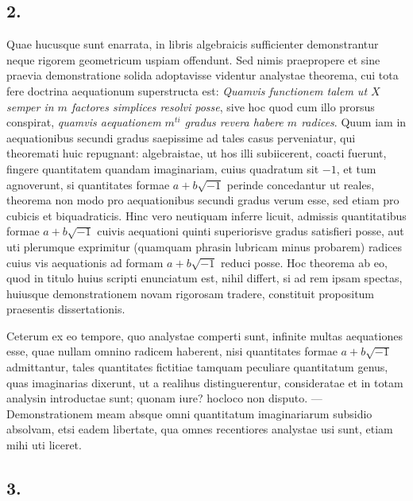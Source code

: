 \documentclass[twoside,12pt, showframe]{memoir}
\begin{document}
\subsection*{2.}

Quae hucusque sunt enarrata, in libris algebraicis sufficienter demonstrantur neque rigorem geometricum uspiam offendunt. Sed nimis praepropere et sine praevia demonstratione solida adoptavisse videntur analystae theorema, cui tota fere doctrina aequationum superstructa est: \textit{Quamvis functionem talem ut \(X\) semper in \(m\) factores simplices resolvi posse}, sive hoc quod cum illo prorsus conspirat, \textit{quamvis aequationem \(m^{ti}\) gradus revera habere \(m\) radices}. Quum iam in aequationibus secundi gradus saepissime ad tales casus perveniatur, qui theoremati huic repugnant: algebraistae, ut hos illi subiicerent, coacti fuerunt, fingere quantitatem quandam imaginariam, cuius quadratum sit \(-1\), et tum agnoverunt, si quantitates formae \(a+b\surd{-1}\) perinde concedantur ut reales, theorema non modo pro aequationibus secundi gradus verum esse, sed etiam pro cubicis et biquadraticis. Hinc vero neutiquam inferre licuit, admissis quantitatibus formae \(a+b\surd{-1}\) cuivis aequationi quinti superiorisve gradus satisfieri posse, aut uti plerumque exprimitur (quamquam phrasin lubricam minus probarem) radices cuius vis aequationis ad formam \(a+b\surd{-1}\) reduci posse. Hoc theorema ab eo, quod in titulo huius scripti enunciatum est, nihil differt, si ad rem ipsam spectas, huiusque demonstrationem novam rigorosam tradere, constituit propositum praesentis dissertationis.

Ceterum ex eo tempore, quo analystae comperti sunt, infinite multas aequationes esse, quae nullam omnino radicem haberent, nisi quantitates formae \(a+b\surd{-1}\) admittantur, tales quantitates fictitiae tamquam peculiare quantitatum genus, quas imaginarias dixerunt, ut a realihus distinguerentur, consideratae et in totam analysin introductae sunt; quonam iure? hocloco non disputo. — Demonstrationem meam absque omni quantitatum imaginariarum subsidio absolvam, etsi eadem libertate, qua omnes recentiores analystae usi sunt, etiam mihi uti liceret.

\subsection*{3.}
\end{document}
